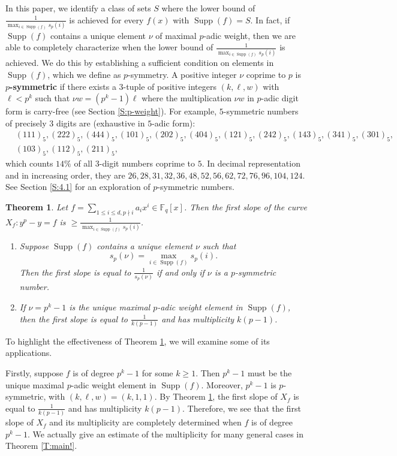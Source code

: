 \documentclass{amsart}
\numberwithin{equation}{section}
\newcommand{\F}{\mathbb{F}}
\DeclareMathOperator{\Supp}{Supp}
\theoremstyle{plain}
\newtheorem{theorem}{Theorem}[section]
\theoremstyle{definition}
\begin{document}
In this paper, we identify a class of sets $S$
where the lower bound of $\frac{1}{\max_{i \in \Supp(f)}s_p(i)}$
is achieved for every $f(x)$ with $\Supp(f) = S$.
In fact, if $\Supp(f)$ contains a unique element $\nu$ of maximal $p$-adic
weight, then we are able to completely characterize when the lower bound of
$\frac{1}{\max_{i \in \Supp(f)}s_p(i)}$ is achieved.
We do this
by establishing a sufficient condition on elements in $\Supp(f)$,
which we define as $p$-symmetry.
A positive integer $\nu$ coprime to $p$ is 
{\bf $p$-symmetric} if 
there exists a $3$-tuple of positive integers $(k,\ell,w)$
with $\ell < p^k$ such that 
$\nu w= (p^k-1)\ell$ where the multiplication $\nu w$ in $p$-adic digit form is
carry-free (see Section \ref{S:p-weight}).
For example, $5$-symmetric numbers of precisely $3$ digits are
(exhaustive in $5$-adic form):
\begin{align*}
&(111)_5, (222)_5,
(444)_5, (101)_5, (202)_5, (404)_5,
(121)_5, (242)_5, (143)_5, (341)_5, (301)_5, \\
&(103)_5, (112)_5,  (211)_5,
\end{align*}
which counts $14\%$ of all 3-digit numbers
coprime to $5$.
In decimal representation and in increasing order, they are 
$26,28,31,32,36,48,52,56,62,72,76,96,104,124.$
See Section \ref{S:4.1}
for an exploration of $p$-symmetric numbers.

\begin{theorem}
\label{T:main-thm-tight}
Let $f=\sum_{1\le i\le d, p\nmid i}a_i x^i \in\F_q[x]$.        
Then the first slope of the curve
    $X_f : y^p - y = f$ is $\ge \frac{1}{\max_{i\in\Supp(f)} s_p(i)}$.
\begin{enumerate}
\item     Suppose $\Supp(f)$ contains a unique element $\nu$ such that
    \[
        s_p(\nu)=\max_{i\in\Supp(f)}s_p(i).
    \]
    Then the first slope is equal to $\frac{1}{s_p(\nu)}$ 
    if and only if $\nu$ is a $p$-symmetric number.
\item If $\nu=p^k-1$ is the unique maximal $p$-adic weight
    element in $\Supp(f)$, then 
the first slope is equal to $\frac{1}{k(p-1)}$ and has multiplicity $k(p-1)$.
\end{enumerate}
\end{theorem}
To highlight the effectiveness of Theorem \ref{T:main-thm-tight},
we will examine some of its applications.

Firstly, suppose $f$ is of degree $p^k-1$ for some $k\ge 1$. 
Then $p^k-1$ must be the unique maximal $p$-adic weight element in $\Supp(f)$. 
Moreover, $p^k - 1$ is $p$-symmetric, with $(k,\ell,w) = (k,1,1)$.
By Theorem \ref{T:main-thm-tight},
the first slope of $X_f$ is equal to $\frac{1}{k(p-1)}$
and has multiplicity $k(p-1)$.
Therefore, we see that the first slope of $X_f$ and its multiplicity 
are completely determined when $f$ is of degree $p^k - 1$.
We actually give an estimate of the multiplicity for many general cases in 
Theorem \ref{T:main!}.
\end{document}

